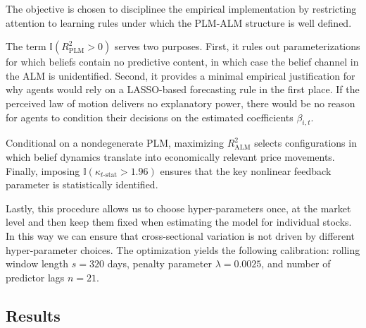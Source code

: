 \documentclass[11pt]{article}
\begin{document}
The objective is chosen to disciplinee the empirical implementation by restricting
attention to learning rules under which the PLM-ALM structure is well defined.

The term \(\mathbb{I}(R^2_{\text{PLM}}>0)\) serves two purposes. First, it rules out
parameterizations for which beliefs contain no predictive content, in which case the
belief channel in the ALM is unidentified. Second, it provides a minimal empirical
justification for why agents would rely on a LASSO-based forecasting rule in the first
place. If the perceived law of motion delivers no explanatory power, there would be no reason
for agents to condition their decisions on the estimated coefficients \(\beta_{i,t}\).

Conditional on a nondegenerate PLM, maximizing \(R^2_{\text{ALM}}\) selects configurations
in which belief dynamics translate into economically relevant price movements. Finally,
imposing \(\mathbb{I}(\kappa_{t\text{-stat}}>1.96)\) ensures that the key nonlinear feedback
parameter is statistically identified.

Lastly, this procedure allows us to choose hyper-parameters once, at the market level and then keep them 
fixed when estimating the model for individual stocks.
In this way we can ensure that cross-sectional variation is not driven by different hyper-parameter choices.
The optimization yields the following calibration: rolling window length \(s = 320\) days, penalty parameter \(\lambda = 0.0025\), and number of predictor lags \(n = 21\).


\subsection{Results}
\end{document}
